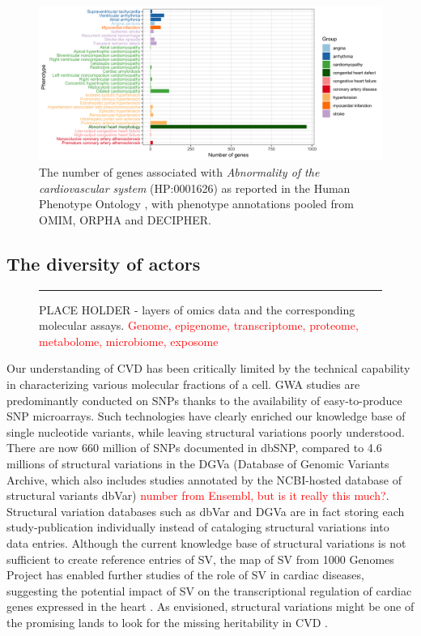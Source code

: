 \documentclass[letter]{bioinfo}
\newcommand{\comment}[1]{\textcolor{red}{#1}}
\begin{document}
\begin{figure}[!tpb]
	\includegraphics[width=1.\linewidth]{hpo-gene-count}
	\caption{The number of genes associated with \textit{Abnormality of the cardiovascular system} (HP:0001626) as reported in the Human Phenotype Ontology \citep{Kohler:2014:Human}, with phenotype annotations pooled from OMIM, ORPHA and DECIPHER.}
	\label{fig:hpo_gene_count}	
\end{figure}


\subsection{The diversity of actors}


\begin{figure}[!tpb]
	\rule{2cm}{2cm}
	\caption{PLACE HOLDER - layers of omics data and the corresponding molecular assays. \comment{Genome, epigenome, transcriptome, proteome, metabolome, microbiome, exposome}}
	\label{fig:multiomics}
\end{figure} 

Our understanding of CVD has been critically limited by the technical capability in characterizing various molecular fractions of a cell. GWA studies are predominantly conducted on SNPs thanks to the availability of easy-to-produce SNP microarrays. Such technologies have clearly enriched our knowledge base of single nucleotide variants, while leaving structural variations poorly understood. There are now 660 million of SNPs documented in dbSNP, compared to 4.6 millions of structural variations in the DGVa (Database of Genomic Variants Archive, which also includes studies annotated by the NCBI-hosted database of structural variants dbVar) \comment{number from Ensembl, but is it really this much?}. Structural variation databases such as dbVar and DGVa are in fact storing each study-publication individually instead of cataloging structural variations into data entries. Although the current knowledge base of structural variations is not sufficient to create reference entries of SV, the map of SV from 1000 Genomes Project \citep{Sudmant:2015:integrated} has enabled further studies of the role of SV in cardiac diseases, suggesting the potential impact of SV on the transcriptional regulation of cardiac genes expressed in the heart \citep{Haas:2018:Genomic}. As envisioned, structural variations might be one of the promising lands to look for the missing heritability in CVD \citep{Eichler:2010:Missing}.
\end{document}
